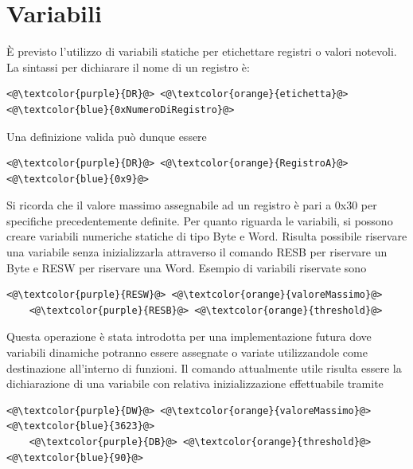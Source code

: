 \section{Variabili}
È previsto l'utilizzo di variabili statiche per etichettare registri o valori notevoli.
La sintassi per dichiarare il nome di un registro è:
\begin{lstlisting}[numbers=none]
    <@\textcolor{purple}{DR}@> <@\textcolor{orange}{etichetta}@> <@\textcolor{blue}{0xNumeroDiRegistro}@>
\end{lstlisting}
Una definizione valida può dunque essere
\begin{lstlisting}[numbers=none]
    <@\textcolor{purple}{DR}@> <@\textcolor{orange}{RegistroA}@> <@\textcolor{blue}{0x9}@>
\end{lstlisting}
Si ricorda che il valore massimo assegnabile ad un registro è pari a 0x30 per specifiche precedentemente definite.
Per quanto riguarda le variabili, si possono creare variabili numeriche statiche di tipo Byte e Word.
Risulta possibile riservare una variabile senza inizializzarla attraverso il comando RESB per riservare un Byte  e RESW per riservare una Word.
Esempio di variabili riservate sono
\begin{lstlisting}[numbers=none]
    <@\textcolor{purple}{RESW}@> <@\textcolor{orange}{valoreMassimo}@>
    <@\textcolor{purple}{RESB}@> <@\textcolor{orange}{threshold}@>
\end{lstlisting}
Questa operazione è stata introdotta per una implementazione futura dove variabili dinamiche potranno essere assegnate o variate utilizzandole come destinazione all'interno di funzioni.
Il comando attualmente utile risulta essere la dichiarazione di una variabile con relativa inizializzazione effettuabile tramite
\begin{lstlisting}[numbers=none]
    <@\textcolor{purple}{DW}@> <@\textcolor{orange}{valoreMassimo}@> <@\textcolor{blue}{3623}@>
    <@\textcolor{purple}{DB}@> <@\textcolor{orange}{threshold}@> <@\textcolor{blue}{90}@>
\end{lstlisting}


